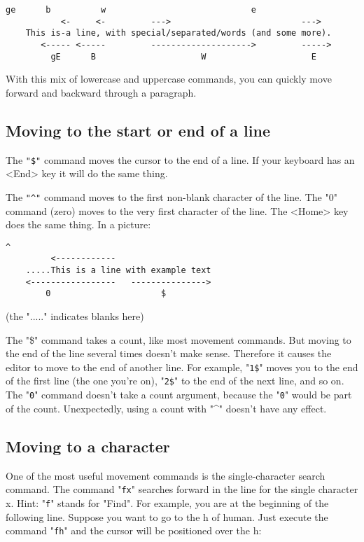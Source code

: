 \begin{Verbatim}[samepage=true]
           ge      b          w                             e
           <-     <-         --->                          --->
    This is-a line, with special/separated/words (and some more). 
       <----- <-----         -------------------->         ----->
         gE      B                     W                     E
\end{Verbatim}

With this mix of lowercase and uppercase commands, you can quickly move forward and backward through a paragraph.

\subsection{Moving to the start or end of a line}

The \texttt{"\$"} command moves the cursor to the end of a line.
If your keyboard has an <End> key it will do the same thing.

The \texttt{"\^{}"} command moves to the first non-blank character of the line.
The "0" command (zero) moves to the very first character of the line.
The <Home> key does the same thing.
In a picture:

\begin{Verbatim}[samepage=true]
               ^
         <------------
    .....This is a line with example text 
    <-----------------   --------------->
        0                      $
\end{Verbatim}

(the "....." indicates blanks here)

The "\$" command takes a count, like most movement commands.
But moving to the end of the line several times doesn't make sense.
Therefore it causes the editor to move to the end of another line.
For example, "\texttt{1\$}" moves you to the end of the first line (the one you're on), "\texttt{2\$}" to the end of the next line, and so on.
The "\texttt{0}" command doesn't take a count argument, because the "\texttt{0}" would be part of the count.
Unexpectedly, using a count with "\textasciicircum" doesn't have any effect.

\subsection{Moving to a character}
One of the most useful movement commands is the single-character search command.
The command "\texttt{fx}" searches forward in the line for the single character x.
Hint: "\texttt{f}" stands for "Find".
For example, you are at the beginning of the following line.
Suppose you want to go to the h of human.
Just execute the command "\texttt{fh}" and the cursor will be positioned over the h:

